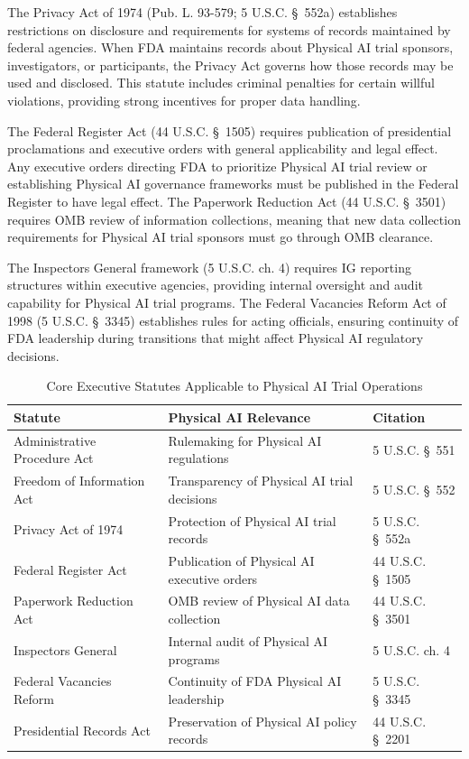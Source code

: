 The Privacy Act of 1974 (Pub. L. 93-579; 5 U.S.C. \S~552a) establishes
restrictions on disclosure and requirements for systems of records maintained by
federal agencies. When FDA maintains records about Physical AI trial sponsors,
investigators, or participants, the Privacy Act governs how those records may
be used and disclosed. This statute includes criminal penalties for certain
willful violations, providing strong incentives for proper data handling.

The Federal Register Act (44 U.S.C. \S~1505) requires publication of
presidential proclamations and executive orders with general applicability and
legal effect. Any executive orders directing FDA to prioritize Physical AI
trial review or establishing Physical AI governance frameworks must be
published in the Federal Register to have legal effect. The Paperwork Reduction
Act (44 U.S.C. \S~3501) requires OMB review of information collections,
meaning that new data collection requirements for Physical AI trial sponsors
must go through OMB clearance.

The Inspectors General framework (5 U.S.C. ch. 4) requires IG reporting
structures within executive agencies, providing internal oversight and audit
capability for Physical AI trial programs. The Federal Vacancies Reform Act of
1998 (5 U.S.C. \S~3345) establishes rules for acting officials, ensuring
continuity of FDA leadership during transitions that might affect Physical AI
regulatory decisions.

\begin{table}[H]
\centering
\caption{Core Executive Statutes Applicable to Physical AI Trial Operations}
\label{tab:executive-statutes}
\small
\begin{tabularx}{\textwidth}{l X l}
\toprule
\textbf{Statute} & \textbf{Physical AI Relevance} & \textbf{Citation} \\
\midrule
Administrative Procedure Act & Rulemaking for Physical AI regulations & 5 U.S.C. \S~551 \\
Freedom of Information Act & Transparency of Physical AI trial decisions & 5 U.S.C. \S~552 \\
Privacy Act of 1974 & Protection of Physical AI trial records & 5 U.S.C. \S~552a \\
Federal Register Act & Publication of Physical AI executive orders & 44 U.S.C. \S~1505 \\
Paperwork Reduction Act & OMB review of Physical AI data collection & 44 U.S.C. \S~3501 \\
Inspectors General & Internal audit of Physical AI programs & 5 U.S.C. ch. 4 \\
Federal Vacancies Reform & Continuity of FDA Physical AI leadership & 5 U.S.C. \S~3345 \\
Presidential Records Act & Preservation of Physical AI policy records & 44 U.S.C. \S~2201 \\
\bottomrule
\end{tabularx}
\end{table}

